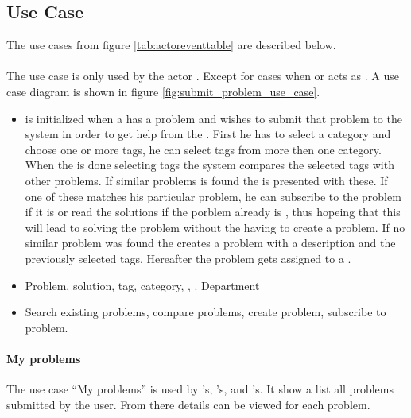 \subsection{Use Case}
\label{sec:usecase}

The use cases from figure \ref{tab:actoreventtable} are described below.  

\paragraph{\ucsproblem[c]} The use case \ucsproblem[] is only used by the actor \aclient. Except for cases when \astaff{} or \sadmin{}  acts as \aclient{}. A use case diagram is shown in figure \ref{fig:submit_problem_use_case}. 
\begin{itemize}
\item {} \ucsproblem[c] is initialized when a \aclient{} has a problem and wishes to submit that problem to the system in order to get help from the \astaff{}. 
First he has to select a category and choose one or more tags, he can select tags from more then one category. 
When the \aclient{} is done selecting tags the system compares the selected tags with other problems. 
If similar problems is found the \aclient{} is presented with these.
If one of these matches his particular problem, he can subscribe to the problem if it is \open or read the solutions if the porblem already is \closed{}, thus hopeing that this will lead to solving the problem without the \aclient[] having to create a problem.
If no similar problem was found the \aclient{} creates a problem with a description and the previously selected tags. 
Hereafter the problem gets assigned to a \astaff{}. 

\item {} Problem, solution, tag, category, \client, \staff. Department 

\item {} Search existing problems, compare problems, create problem, subscribe to problem. 
\end{itemize}

\paragraph{My problems} The use case ``My problems'' is used by  \aclient 's, \astaff 's, and \admin 's. It show a list all problems submitted by the user. From there details can be viewed for each problem. 

